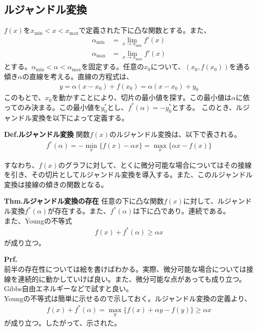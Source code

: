 \documentclass[a4paper,11pt]{jsarticle}
\numberwithin{equation}{section}
\begin{document}
\subsection{ルジャンドル変換}
$f(x)$を$x_{\text{min}} < x < x_{\text{max}}$で定義された下に凸な関数とする。また、
\begin{align}
  \alpha_{\text{min}}  &= \lim_{x \to x_{\text{min}}} f'(x)\\
  \alpha_{\text{max}}  &= \lim_{x \to x_{\text{max}}} f'(x)
\end{align}
とする。$\alpha_{\text{min}}<\alpha < \alpha_{\text{max}}$を固定する。任意の$x_0$について、$(x_0,f(x_0))$を通る傾き$\alpha$の直線を考える。直線の方程式は、
\begin{align}
  y = \alpha(x-x_0) + f(x_0) = \alpha (x-x_0) + y_0
\end{align}
このもとで、$x_0$を動かすことにより、切片の最小値を探す。この最小値は$\alpha$に依ってのみ決まる。この最小値を$y^{*}_{0}$とし、$f^{*} (\alpha) = -y^{*}_{0}$とする。
このとき、ルジャンドル変換を以下によって定義する。
\begin{itembox}[l]{\textbf{Def.ルジャンドル変換}}
  関数$f(x)$のルジャンドル変換は、以下で表される。
  \begin{align}
    f^*(\alpha) = -\min_x \{f(x) - \alpha x\} = \max_x \{\alpha x - f(x)\}
  \end{align}
\end{itembox}
すなわち、$f(x)$のグラフに対して、とくに微分可能な場合についてはその接線を引き、その切片としてルジャンドル変換を導入する。また、このルジャンドル変換は接線の傾きの関数となる。\\

\begin{itembox}[l]{\textbf{Thm.ルジャンドル変換の存在}}
  任意の下に凸な関数$f(x)$に対して、ルジャンドル変換$f^*(\alpha)$が存在する。また、$f^*(\alpha)$は下に凸であり。連続である。\\
  また、Youngの不等式
  \begin{align}
    f(x) + f^*(\alpha) \geq \alpha x
  \end{align}
  が成り立つ。
\end{itembox}
\textbf{Prf.}\\
前半の存在性については絵を書けばわかる。実際、微分可能な場合については接線を連続的に動かしていけば良い。また、微分可能な点があっても成り立つ。Gibbs自由エネルギーなどで試すと良い。\\
Youngの不等式は簡単に示せるので示しておく。ルジャンドル変換の定義より、
\begin{align}
  f(x) + f^*(\alpha) = \max_{y} \{f(x)+\alpha y - f(y)\} \geq\alpha x
\end{align}
が成り立つ。したがって、示された。\hfill\qedsymbol\\
\end{document}

